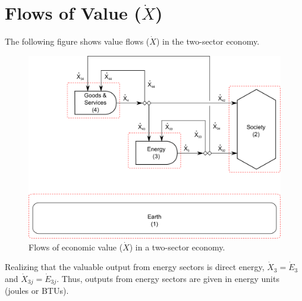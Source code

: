 \section{Flows of Value ($\dot{X}$)}

The following figure shows value flows ($\dot{X}$) in the two-sector economy.

\begin{figure}[h!]
\includegraphics[width=1.0\linewidth]{Chapter_Example_C/images/I-O_three_sector_value.pdf}
\caption{Flows of economic value ($\dot{X}$) in a two-sector economy.}
\label{fig:economic_value_flows_2}
\end{figure}

Realizing that the valuable output from energy sectors is direct energy, $\dot{X}_{3} = \dot{E}_{3}$ and $\dot{X}_{3j} = \dot{E}_{3j}$. Thus, outputs from energy sectors are given in energy units (joules or BTUs). 

%
%
%
%

